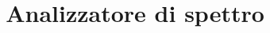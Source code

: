 \documentclass[a4paper]{article}
\begin{document}
	\title{Analizzatore di spettro}
	\maketitle
	
\end{document}

